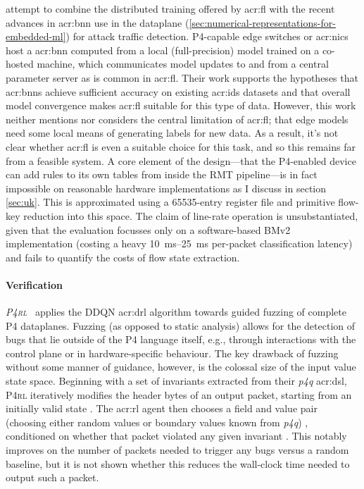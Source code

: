 \Textcite{DBLP:conf/networking/QinPLT20} attempt to combine the distributed training offered by \gls{acr:fl} with the recent advances in \gls{acr:bnn} use in the dataplane (\cref{sec:numerical-representations-for-embedded-ml}) for attack traffic detection.
P4-capable edge switches or \glspl{acr:nic} host a \gls{acr:bnn} computed from a local (full-precision) model trained on a co-hosted machine, which communicates model updates to and from a central parameter server as is common in \gls{acr:fl}.
Their work supports the hypotheses that \glspl{acr:bnn} achieve sufficient accuracy on existing \gls{acr:ids} datasets and that overall model convergence makes \gls{acr:fl} suitable for this type of data.
However, this work neither mentions nor considers the central limitation of \gls{acr:fl}; that edge models need some local means of generating labels for new data.
As a result, it's not clear whether \gls{acr:fl} is even a suitable choice for this task, and so this remains far from a feasible system.
A core element of the design---that the P4-enabled device can add rules to its own tables from inside the RMT pipeline---is in fact impossible on reasonable hardware implementations as I discuss in section \cref{sec:uk}.
This is approximated using a \num{65535}-entry register file and primitive flow-key reduction into this space.
The claim of line-rate operation is unsubstantiated, given that the evaluation focusses only on a software-based BMv2 implementation (costing a heavy \qtyrange{10}{25}{\milli\second} per-packet classification latency) and fails to quantify the costs of flow state extraction.

\paragraph{Verification}
\emph{\textsc{P4rl}}~\parencite{DBLP:conf/sigcomm/ShuklaHH019} applies the DDQN \gls{acr:drl} algorithm towards guided fuzzing of complete P4 dataplanes.
Fuzzing (as opposed to static analysis) allows for the detection of bugs that lie outside of the P4 language itself, e.g., through interactions with the control plane or in hardware-specific behaviour.
The key drawback of fuzzing without some manner of guidance, however, is the colossal size of the input value state space.
Beginning with a set of invariants extracted from their \emph{p4q} \gls{acr:dsl}, \textsc{P4rl} iteratively modifies the header bytes of an output packet, starting from an initially valid state \prllitstate{}.
The \gls{acr:rl} agent then chooses a field and value pair (choosing either random values or boundary values known from \emph{p4q}) \prllitact{}, conditioned on whether that packet violated any given invariant \prllitreward{}.
This notably improves on the number of packets needed to trigger any bugs versus a random baseline, but it is not shown whether this reduces the wall-clock time needed to output such a packet.

